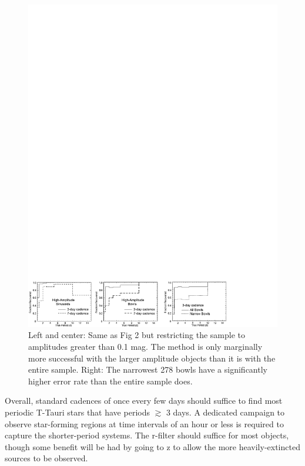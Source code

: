 \begin{figure}[b]
\vspace*{1.0 cm}
\begin{center}
 \includegraphics[width=5.32in]{figs/starFormation/tts3.pdf}
 \caption{Left and center: Same as Fig 2 but restricting the sample to amplitudes greater than 0.1 mag. The
method is only marginally more successful with the larger amplitude objects than it is with the entire sample.
Right: The narrowest 278 bowls have a significantly higher error rate than the entire sample does.
}
   \label{tts3}
\end{center}
\end{figure}

Overall, standard cadences of once every few days should suffice
to find most periodic T-Tauri stars that have periods $\gtrsim$ 3 days. 
A dedicated campaign to observe star-forming regions 
at time intervals of an hour or less is required to capture the shorter-period systems.
The r-filter should suffice for most objects, though some benefit will be had
by going to z to allow the more heavily-extincted sources to be observed.

